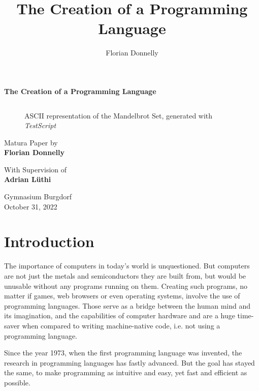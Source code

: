 \documentclass[12pt,a4paper]{article}
\author{Florian Donnelly}
\title{The Creation of a Programming Language}
\newcommand{\paste}[1]{
    \begin{tabular}{c}
    
    \end{tabular}
}
\newcommand{\name}{\emph{TestScript}}
\begin{document}
\begin{titlepage}\begin{center}

    \vspace*{1.5cm}
    \Huge
    \textbf{The Creation of a Programming Language}

    \vspace{1.5cm}

    \begin{figure}[H]
        \centering
        \paste{paper/mandelbrot.tex}
        \caption{ASCII representation of the Mandelbrot Set, generated with \name{}}
        \label{f_mandelbrot}
    \end{figure}


    \Large
    \vspace{1.5cm}
    Matura Paper by\\ \textbf{Florian Donnelly}
    
    \vspace{0.5cm}
    With Supervision of\\ \textbf{Adrian Lüthi}

    \vfill
    Gymnasium Burgdorf\\ October 31, 2022

\end{center}\end{titlepage}

\normalsize


\tableofcontents\newpage

\section{Introduction}
The importance of computers in today's world is unquestioned.
But computers are not just the metals and semiconductors they are built from,
but would be unusable without any programs running on them.
Creating such programs, no matter if games, web browsers or even operating systems,
involve the use of programming languages.
Those serve as a bridge between the human mind and its imagination, and
the capabilities of computer hardware and are a huge time-saver when compared
to writing machine-native code, i.e. not using a programming language.

Since the year 1973, when the first programming language was invented, the
research in programming languages has fastly advanced. But the goal has stayed
the same, to make programming as intuitive and easy, yet fast and efficient as
possible.
\end{document}
